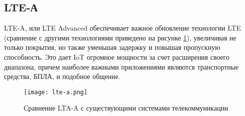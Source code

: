 \subsection{LTE-А}
LTE-A, или LTE Advanced обеспечивает важное обновление технологии LTE (сравнение с другими технологиями приведено на рисунке \ref{fig:section6:lte-a}), увеличивая не только
покрытия, но также уменьшая задержку и повышая пропускную способность. Это дает IoT огромное
мощности за счет расширения своего диапазона, причем наиболее важными приложениями являются транспортные средства, БПЛА,
и подобное общение.

\begin{figure}[h!]
    \centering
    \texttt{[image: lte-a.png]}
    \caption{Сравнение LTA-A с существующими системами телекоммуникации}
    \label{fig:section6:lte-a}
\end{figure}